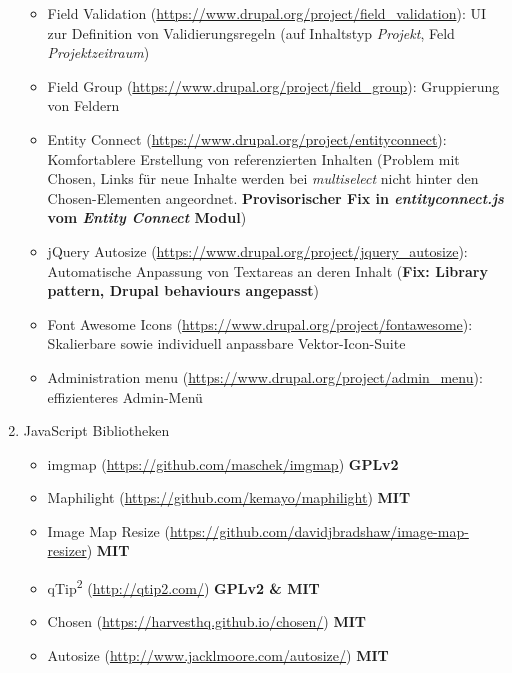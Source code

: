 \begin{enumerate}[parsep=0pt, itemsep=5.0pt plus 2.0pt minus 1.0pt, leftmargin=*]
\begin{itemize}
		\item Field Validation (\url{https://www.drupal.org/project/field_validation}):
		UI zur Definition von Validierungsregeln (\zB auf Inhaltstyp \textit{Projekt}, Feld \textit{Projektzeitraum})

		\item Field Group (\url{https://www.drupal.org/project/field_group}):
		Gruppierung von Feldern

		\item Entity Connect (\url{https://www.drupal.org/project/entityconnect}):
		Komfortablere Erstellung von referenzierten Inhalten
		(Problem mit Chosen, Links für neue Inhalte werden bei \textit{multiselect} nicht hinter den Chosen-Elementen angeordnet. \textbf{Provisorischer Fix in \textit{entityconnect.js} vom \textit{Entity Connect} Modul})

		\item jQuery Autosize (\url{https://www.drupal.org/project/jquery_autosize}):
		Automatische Anpassung von Textareas an deren Inhalt
		(\textbf{Fix: Library pattern, Drupal behaviours angepasst})

		\item Font Awesome Icons (\url{https://www.drupal.org/project/fontawesome}):
		Skalierbare sowie individuell anpassbare Vektor-Icon-Suite

		\item Administration menu (\url{https://www.drupal.org/project/admin_menu}):
		effizienteres Admin-Menü
	\end{itemize}

	\item JavaScript Bibliotheken
	\begin{itemize}
		\item imgmap (\url{https://github.com/maschek/imgmap})  \textbf{GPLv2}
		\item Maphilight (\url{https://github.com/kemayo/maphilight}) \textbf{MIT}
		\item Image Map Resize (\url{https://github.com/davidjbradshaw/image-map-resizer}) \textbf{MIT}
		\item qTip\textsuperscript{2} (\url{http://qtip2.com/}) \textbf{GPLv2 \& MIT}
		\item Chosen (\url{https://harvesthq.github.io/chosen/}) \textbf{MIT}
		\item Autosize (\url{http://www.jacklmoore.com/autosize/}) \textbf{MIT}
	\end{itemize}


\end{enumerate}
